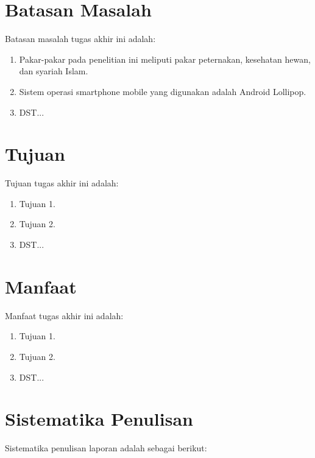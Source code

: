\section{Batasan Masalah}
Batasan masalah tugas akhir ini adalah:
\begin{enumerate}
	\item Pakar-pakar pada penelitian ini meliputi pakar peternakan, kesehatan hewan, dan syariah Islam.
	\item Sistem operasi smartphone mobile yang digunakan adalah Android Lollipop.
	\item DST...
\end{enumerate}

\section{Tujuan}
Tujuan tugas akhir ini adalah:
\begin{enumerate}
	\item Tujuan 1.
	\item Tujuan 2.
	\item DST...
\end{enumerate}

\section{Manfaat}
Manfaat tugas akhir ini adalah:
\begin{enumerate}
	\item Tujuan 1.
	\item Tujuan 2.
	\item DST...
\end{enumerate}

\section{Sistematika Penulisan}
Sistematika penulisan laporan adalah sebagai berikut:

